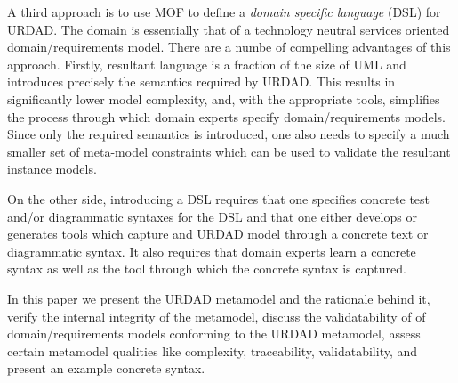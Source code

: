 A third approach is to use MOF to define a {\em domain specific language} (DSL) for URDAD. The domain is essentially that of a technology neutral services oriented domain/requirements model. There are a numbe of compelling advantages of this approach. Firstly, resultant language is a fraction of the size of UML and introduces precisely the semantics required by URDAD. This results in significantly lower model complexity, and, with the appropriate tools, simplifies the process through which domain experts specify domain/requirements models. Since only the required semantics is introduced, one also needs to specify a much smaller set of meta-model constraints which can be used to validate the resultant instance models.

On the other side, introducing a DSL requires that one specifies concrete test and/or diagrammatic syntaxes for the DSL and that one either develops or generates tools which capture and URDAD model through a concrete text or diagrammatic syntax. It also requires that domain experts learn a concrete syntax as well as the tool through which the concrete syntax is captured.


In this paper we present the URDAD metamodel and the rationale behind it, verify the internal integrity of the metamodel,
discuss the validatability of of domain/requirements models conforming to the URDAD metamodel, assess certain metamodel qualities like complexity, traceability, validatability, and present an example concrete syntax.

